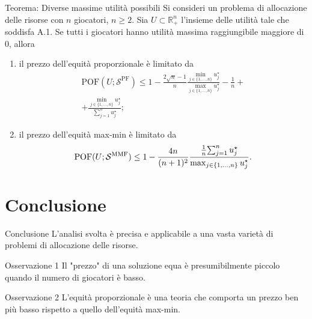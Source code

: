 \documentclass{beamer}
\begin{document}
\begin{frame}
	\begin{exampleblock}{Teorema: Diverse massime utilità possibili}
		\vspace{-0.1cm}
		Si consideri un problema di allocazione delle risorse con $n$ giocatori, $n \ge 2$. Sia $U \subset \mathbb{R}^n_+$ l'insieme delle utilità tale che soddisfa A.1. Se tutti i giocatori hanno utilità massima raggiungibile maggiore di $0$, allora
		\vspace{-0.1cm}
		\begin{enumerate}
			\item il prezzo dell'equità proporzionale è limitato da
			\vspace{-0.3cm}
			\begin{multline}
				\text{POF}(U;\mathcal{S}^{\text{PF}}) \le 1 - \frac{2 \sqrt{n} - 1}{n} \frac{\min_{j \in \{1,\dots,n\}} u_j^{\star} }{\max_{j \in \{1,\dots,n\}} u_j^{\star}} - \frac{1}{n} + \\ + \frac{\min_{j \in \{1,\dots,n\}} u_j^{\star}}{\sum_{j=1}^n u_j^{\star}};
			\end{multline}
			\item il prezzo dell'equità max-min è limitato da
			\vspace{-0.3cm}
			\begin{equation}
				\text{POF}(U;\mathcal{S}^{\text{MMF}}) \le 1 - \frac{4n}{(n+1)^2} \frac{\frac{1}{n}{\sum_{j=1}^n u_j^{\star}}}{\max_{j \in \{1,\dots,n\}} u_j^{\star}}.
				\vspace{-0.3cm}
			\end{equation}
		\end{enumerate}
		\vspace{-0.1cm}
	\end{exampleblock}
\end{frame}

\section{Conclusione}

\begin{frame}{Conclusione}
	L'analisi svolta è precisa e applicabile a una vasta varietà di problemi di allocazione delle risorse.
	\begin{exampleblock}{Osservazione 1}
		Il "prezzo" di una soluzione equa è presumibilmente piccolo quando il numero di giocatori è basso.
	\end{exampleblock}
	\begin{exampleblock}{Osservazione 2}
		L'equità proporzionale è una teoria che comporta un prezzo ben più basso rispetto a quello dell'equità max-min. 
	\end{exampleblock}
\end{frame}
\end{document}
